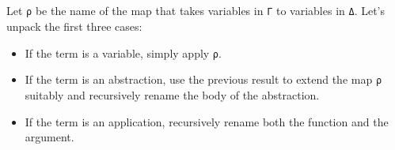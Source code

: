 \begin{fence}
\begin{code}
\AgdaSpace{}%
\AgdaSymbol{)}\AgdaSpace{}%
\AgdaSpace{}%
\AgdaSymbol{(}\AgdaSpace{}%
\AgdaSpace{}%
\AgdaSymbol{)}\<%
\\
\>[0]\AgdaSpace{}%
\AgdaSpace{}%
\AgdaSymbol{(}\AgdaSymbol{)}%
\>[24]\AgdaSymbol{=}%
\>[27]\<%
\\
\>[0]\AgdaSpace{}%
\AgdaSpace{}%
\AgdaSymbol{(}\AgdaSpace{}%
\AgdaSymbol{)}%
\>[24]\AgdaSymbol{=}%
\>[27]\AgdaSpace{}%
\AgdaSymbol{(}\AgdaSpace{}%
\AgdaSpace{}%
\AgdaSymbol{)}\<%
\\
\>[0]\AgdaSpace{}%
\AgdaSpace{}%
\AgdaSymbol{(}\AgdaSpace{}%
\AgdaSpace{}%
\AgdaSpace{}%
\AgdaSymbol{)}%
\>[24]\AgdaSymbol{=}%
\>[27]\AgdaSpace{}%
\AgdaSymbol{(}\AgdaSpace{}%
\AgdaSpace{}%
\AgdaSymbol{)}\AgdaSpace{}%
\AgdaSymbol{(}\AgdaSpace{}%
\AgdaSpace{}%
\AgdaSymbol{)}\AgdaSpace{}%
\AgdaSymbol{(}\AgdaSpace{}%
\AgdaSymbol{(}\AgdaSpace{}%
\AgdaSymbol{)}\AgdaSpace{}%
\AgdaSymbol{)}\<%
\\
\>[0]\AgdaSpace{}%
\AgdaSpace{}%
\AgdaSymbol{(}\AgdaSpace{}%
\AgdaSymbol{)}%
\>[24]\AgdaSymbol{=}%
\>[27]\AgdaSpace{}%
\AgdaSymbol{(}\AgdaSpace{}%
\AgdaSymbol{(}\AgdaSpace{}%
\AgdaSymbol{)}\AgdaSpace{}%
\AgdaSymbol{)}\<%
\end{code}
\end{fence}

Let \texttt{ρ} be the name of the map that takes variables in \texttt{Γ}
to variables in \texttt{Δ}. Let's unpack the first three cases:

\begin{itemize}
\item
  If the term is a variable, simply apply \texttt{ρ}.
\item
  If the term is an abstraction, use the previous result to extend the
  map \texttt{ρ} suitably and recursively rename the body of the
  abstraction.
\item
  If the term is an application, recursively rename both the function
  and the argument.
\end{itemize}

